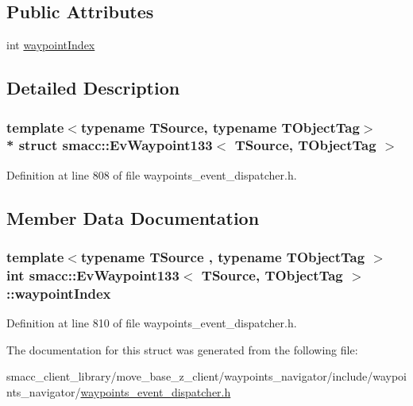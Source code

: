 \subsection*{Public Attributes}
\begin{DoxyCompactItemize}
\item 
int \hyperlink{structsmacc_1_1EvWaypoint133_a73b9fdba0bc71f8a6f6a5f0fc6a1bf9d}{waypoint\+Index}
\end{DoxyCompactItemize}


\subsection{Detailed Description}
\subsubsection*{template$<$typename T\+Source, typename T\+Object\+Tag$>$\\*
struct smacc\+::\+Ev\+Waypoint133$<$ T\+Source, T\+Object\+Tag $>$}



Definition at line 808 of file waypoints\+\_\+event\+\_\+dispatcher.\+h.



\subsection{Member Data Documentation}
\subsubsection[{\texorpdfstring{waypoint\+Index}{waypointIndex}}]{\setlength{\rightskip}{0pt plus 5cm}template$<$typename T\+Source , typename T\+Object\+Tag $>$ int {\bf smacc\+::\+Ev\+Waypoint133}$<$ T\+Source, T\+Object\+Tag $>$\+::waypoint\+Index}\hypertarget{structsmacc_1_1EvWaypoint133_a73b9fdba0bc71f8a6f6a5f0fc6a1bf9d}{}\label{structsmacc_1_1EvWaypoint133_a73b9fdba0bc71f8a6f6a5f0fc6a1bf9d}


Definition at line 810 of file waypoints\+\_\+event\+\_\+dispatcher.\+h.



The documentation for this struct was generated from the following file\+:\begin{DoxyCompactItemize}
\item 
smacc\+\_\+client\+\_\+library/move\+\_\+base\+\_\+z\+\_\+client/waypoints\+\_\+navigator/include/waypoints\+\_\+navigator/\hyperlink{waypoints__event__dispatcher_8h}{waypoints\+\_\+event\+\_\+dispatcher.\+h}\end{DoxyCompactItemize}
